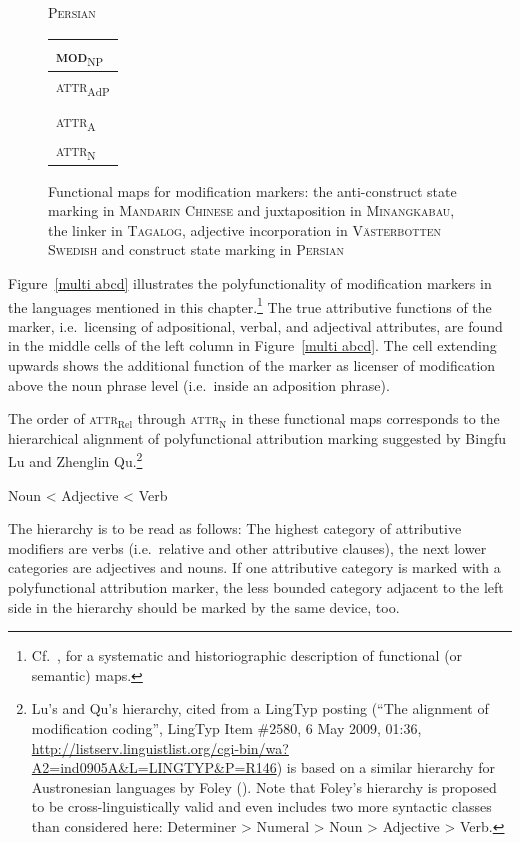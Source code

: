 \begin{figure}
{\begin{center}
\end{center}
}
\parbox[b]{0.20\textwidth}{
\begin{center}\textsc{Persian}\\
\bigskip
\begin{tabular}{| l |}
\hline
\textsc{mod}$_{\text{NP}}$\\
\hline
\hline
\textsc{attr}$_{\text{AdP}}$\\
\hline
\\
\hline
\textsc{attr}$_{\text{A}}$\\
\hline
\textsc{attr}$_{\text{N}}$\\
\hline
\end{tabular}
\end{center}
}
\caption[Functional map for modification marking]{Functional maps for modification markers: the anti\hyp{}construct state marking in \textsc{Mandarin Chinese} and juxtaposition in \textsc{Minangkabau}, the linker in \textsc{Tagalog}, adjective incorporation in \textsc{Västerbotten Swedish} and construct state marking in \textsc{Persian}
}
\end{figure}
Figure~\ref{multi abcd} illustrates the polyfunctionality of modification markers in the languages mentioned in this chapter.\footnote{Cf.~\cite{haspelmath2003}, for a systematic and historiographic description of functional (or semantic) maps.} The true attributive functions of the marker, i.e.~licensing of adpositional, verbal, and adjectival attributes, are found in the middle cells of the left column in Figure~\ref{multi abcd}. The cell extending upwards shows the additional function of the marker as licenser of modification above the noun phrase level (i.e.~inside an adposition phrase).%

The order of \textsc{attr}$_{\text{Rel}}$ through \textsc{attr}$_{\text{N}}$ in these functional maps corresponds to the hierarchical alignment of polyfunctional attribution marking suggested by Bingfu Lu and Zhenglin Qu.\footnote{Lu's and Qu's hierarchy, cited from a LingTyp posting (“The alignment of modification coding”, LingTyp Item \#2580, 6 May 2009, 01:36, \url{http://listserv.linguistlist.org/cgi-bin/wa?A2=ind0905A&L=LINGTYP&P=R146}) is based on a similar hierarchy for Austronesian languages by Foley (\citeyear{foley1980}). Note that Foley's hierarchy is proposed to be cross-linguistically valid and even includes two more syntactic classes than considered here: Determiner > Numeral > Noun > Adjective > Verb.}
\begin{exe}
\ex	Noun < Adjective < Verb
\end{exe}
The hierarchy is to be read as follows: The highest category of attributive modifiers are verbs (i.e.~relative and other attributive clauses), the next lower categories are adjectives and nouns. If one attributive category is marked with a polyfunctional attribution marker, the less bounded category adjacent to the left side in the hierarchy should be marked by the same device, too.

